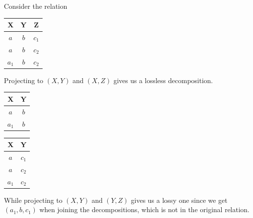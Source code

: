 \documentclass{article}
\begin{document}
    \begin{example}
      Consider the relation 
      \begin{table}[H]
        \centering
        \begin{tabular}{|c|c|c|}
          \hline
          \textbf{X} & \textbf{Y} & \textbf{Z} \\
          \hline
          $a$ & $b$ & $c_1$ \\
          $a$ & $b$ & $c_2$ \\
          $a_1$ & $b$ & $c_2$ \\
          \hline
        \end{tabular}
        \label{tab:ex5}
      \end{table}
      Projecting to $(X, Y)$ and $(X, Z)$ gives us a lossless decomposition. 
      \begin{table}[H]
        \centering
        \begin{minipage}{.5\textwidth}
          \centering
          \begin{tabular}{|c|c|}
            \hline
            \textbf{X} & \textbf{Y} \\
            \hline
            $a$ & $b$ \\
            $a_1$ & $b$ \\
            \hline
          \end{tabular}
          \label{tab:ex6}
        \end{minipage}
        \begin{minipage}{.5\textwidth}
          \centering
          \begin{tabular}{|c|c|}
            \hline
            \textbf{X} & \textbf{Y} \\
            \hline
            $a$ & $c_1$ \\
            $a$ & $c_2$ \\
            $a_1$ & $c_2$ \\
            \hline
          \end{tabular}
          \label{tab:ex7}
        \end{minipage}
      \end{table}
      While projecting to $(X, Y)$ and $(Y, Z)$ gives us a lossy one since we get $(a_1, b, c_1)$ when joining the decompositions, which is not in the original relation. 
      \begin{table}[H]
        \centering
        \begin{minipage}{.5\textwidth}
          \centering

\end{minipage}
\end{table}
\end{example}
\end{document}
